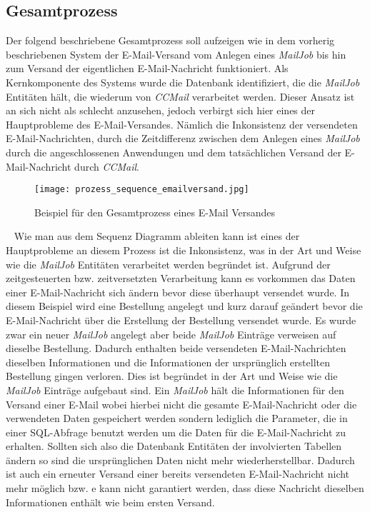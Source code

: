 \subsection{Gesamtprozess}
\label{sec:ccmail-gesamtprozess}
Der folgend beschriebene Gesamtprozess soll aufzeigen wie in dem vorherig beschriebenen System der E-Mail-Versand vom Anlegen eines \emph{MailJob} bis hin zum Versand der eigentlichen E-Mail-Nachricht funktioniert. Als Kernkomponente des Systems wurde die Datenbank identifiziert, die die \emph{MailJob} Entitäten hält, die wiederum von \emph{CCMail} verarbeitet werden. Dieser Ansatz ist an sich nicht als schlecht anzusehen, jedoch verbirgt sich hier eines der Hauptprobleme des E-Mail-Versandes. Nämlich die Inkonsistenz der versendeten E-Mail-Nachrichten, durch die Zeitdifferenz zwischen dem Anlegen eines \emph{MailJob} durch die angeschlossenen Anwendungen und dem tatsächlichen Versand der E-Mail-Nachricht durch \emph{CCMail}.
\begin{figure}[h]
\centering
\texttt{[image: prozess\_sequence\_emailversand.jpg]}
\caption{Beispiel für den Gesamtprozess eines E-Mail Versandes}
\label{fig:sequence-diagramm-gesamtprozess}
\end{figure}
\ \newline
Wie man aus dem Sequenz Diagramm ableiten kann ist eines der Hauptprobleme an diesem Prozess ist die Inkonsistenz, was in der Art und Weise wie die \emph{MailJob} Entitäten verarbeitet werden begründet ist. Aufgrund der zeitgesteuerten bzw. zeitversetzten Verarbeitung kann es vorkommen das Daten einer E-Mail-Nachricht sich ändern bevor diese überhaupt versendet wurde. In diesem Beispiel wird eine Bestellung angelegt und kurz darauf geändert bevor die E-Mail-Nachricht über die Erstellung der Bestellung versendet wurde. Es wurde zwar ein neuer \emph{MailJob} angelegt aber beide \emph{MailJob} Einträge verweisen auf dieselbe Bestellung. Dadurch enthalten beide versendeten E-Mail-Nachrichten dieselben Informationen und die Informationen der ursprünglich erstellten Bestellung gingen verloren. 
\newline
\newline
Dies ist begründet in der Art und Weise wie die \emph{MailJob} Einträge aufgebaut sind. Ein \emph{MailJob} hält die Informationen für den Versand einer E-Mail wobei hierbei nicht die gesamte E-Mail-Nachricht oder die verwendeten Daten gespeichert werden sondern lediglich die Parameter, die in einer SQL-Abfrage benutzt werden um die Daten für die E-Mail-Nachricht zu erhalten. Sollten sich also die Datenbank Entitäten der involvierten Tabellen ändern so sind die ursprünglichen Daten nicht mehr wiederherstellbar. Dadurch ist auch ein erneuter Versand einer bereits versendeten E-Mail-Nachricht nicht mehr möglich bzw. e kann nicht garantiert werden, dass diese Nachricht dieselben Informationen enthält wie beim ersten Versand.

